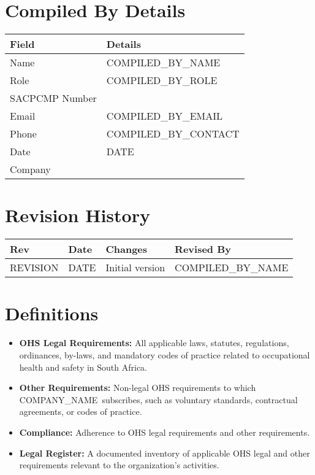 \documentclass[11pt]{article}
\newcommand{\issueDate}{{{DATE}}}
\newcommand{\clientName}{{{COMPANY_NAME}}}
\newcommand{\compilerName}{{{COMPILED_BY_NAME}}}
\newcommand{\compilerRole}{{{COMPILED_BY_ROLE}}}
\newcommand{\compilerSACPCMP}{}
\newcommand{\compilerEmail}{{{COMPILED_BY_EMAIL}}}
\newcommand{\compilerPhone}{{{COMPILED_BY_CONTACT}}}
\newcommand{\compilerCompany}{}
\newcommand{\revision}{{{REVISION}}}
\begin{document}
\section{Compiled By Details}
\begin{tabularx}{\textwidth}{lX}
  \toprule
  \textbf{Field} & \textbf{Details} \\
  \midrule
  Name & \compilerName \\
  Role & \compilerRole \\
  SACPCMP Number & \compilerSACPCMP \\
  Email & \compilerEmail \\
  Phone & \compilerPhone \\
  Date & \issueDate \\
  Company & \compilerCompany \\
  \bottomrule
\end{tabularx}

\section{Revision History}
\begin{tabularx}{\textwidth}{lXll}
  \toprule
  \textbf{Rev} & \textbf{Date} & \textbf{Changes} & \textbf{Revised By} \\
  \midrule
  \revision & \issueDate & Initial version & \compilerName \\
  \bottomrule
\end{tabularx}

\section{Definitions}
\begin{itemize}
    \item \textbf{OHS Legal Requirements:} All applicable laws, statutes, regulations, ordinances, by-laws, and mandatory codes of practice related to occupational health and safety in South Africa.
    \item \textbf{Other Requirements:} Non-legal OHS requirements to which \clientName\ subscribes, such as voluntary standards, contractual agreements, or codes of practice.
    \item \textbf{Compliance:} Adherence to OHS legal requirements and other requirements.
    \item \textbf{Legal Register:} A documented inventory of applicable OHS legal and other requirements relevant to the organization's activities.
\end{itemize}
\end{document}
